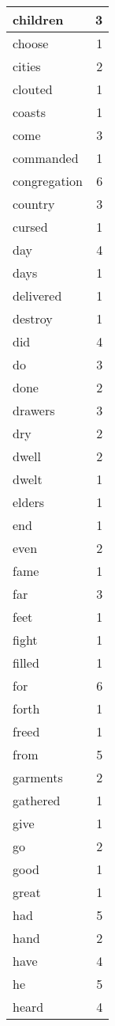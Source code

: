 \begin{center}
\begin{longtable}{l|r}
children & 3\\ \hline 
choose & 1\\ \hline 
cities & 2\\ \hline 
clouted & 1\\ \hline 
coasts & 1\\ \hline 
come & 3\\ \hline 
commanded & 1\\ \hline 
congregation & 6\\ \hline 
country & 3\\ \hline 
cursed & 1\\ \hline 
day & 4\\ \hline 
days & 1\\ \hline 
delivered & 1\\ \hline 
destroy & 1\\ \hline 
did & 4\\ \hline 
do & 3\\ \hline 
done & 2\\ \hline 
drawers & 3\\ \hline 
dry & 2\\ \hline 
dwell & 2\\ \hline 
dwelt & 1\\ \hline 
elders & 1\\ \hline 
end & 1\\ \hline 
even & 2\\ \hline 
fame & 1\\ \hline 
far & 3\\ \hline 
feet & 1\\ \hline 
fight & 1\\ \hline 
filled & 1\\ \hline 
for & 6\\ \hline 
forth & 1\\ \hline 
freed & 1\\ \hline 
from & 5\\ \hline 
garments & 2\\ \hline 
gathered & 1\\ \hline 
give & 1\\ \hline 
go & 2\\ \hline 
good & 1\\ \hline 
great & 1\\ \hline 
had & 5\\ \hline 
hand & 2\\ \hline 
have & 4\\ \hline 
he & 5\\ \hline 
heard & 4\\ \hline 

\end{longtable}
\end{center}
